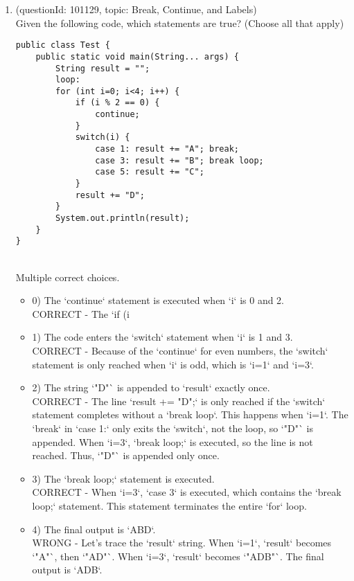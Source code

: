 \documentclass[12pt]{article}
\begin{document}
\begin{enumerate}[label=(\arabic*)]
\begin{itemize}
\end{itemize}
\item (questionId: 101129, topic: Break, Continue, and Labels) \\ 
Given the following code, which statements are true? (Choose all that apply)\n\begin{verbatim}
public class Test {
    public static void main(String... args) {
        String result = "";
        loop:
        for (int i=0; i<4; i++) {
            if (i % 2 == 0) {
                continue;
            }
            switch(i) {
                case 1: result += "A"; break;
                case 3: result += "B"; break loop;
                case 5: result += "C";
            }
            result += "D";
        }
        System.out.println(result);
    }
}
\end{verbatim}
\\ \noindent Multiple correct choices. 
\begin{itemize}
\item 0) The `continue` statement is executed when `i` is 0 and 2.
 \\ 
CORRECT - The `if (i %

\item 1) The code enters the `switch` statement when `i` is 1 and 3.
 \\ 
CORRECT - Because of the `continue` for even numbers, the `switch` statement is only reached when `i` is odd, which is `i=1` and `i=3`.

\item 2) The string `"D"` is appended to `result` exactly once.
 \\ 
CORRECT - The line `result += "D";` is only reached if the `switch` statement completes without a `break loop`. This happens when `i=1`. The `break` in `case 1:` only exits the `switch`, not the loop, so `"D"` is appended. When `i=3`, `break loop;` is executed, so the line is not reached. Thus, `"D"` is appended only once.

\item 3) The `break loop;` statement is executed.
 \\ 
CORRECT - When `i=3`, `case 3` is executed, which contains the `break loop;` statement. This statement terminates the entire `for` loop.

\item 4) The final output is `ABD`.
 \\ 
WRONG - Let's trace the `result` string. When `i=1`, `result` becomes `"A"`, then `"AD"`. When `i=3`, `result` becomes `"ADB"`. The final output is `ADB`.


\end{itemize}
\end{enumerate}
\end{document}
